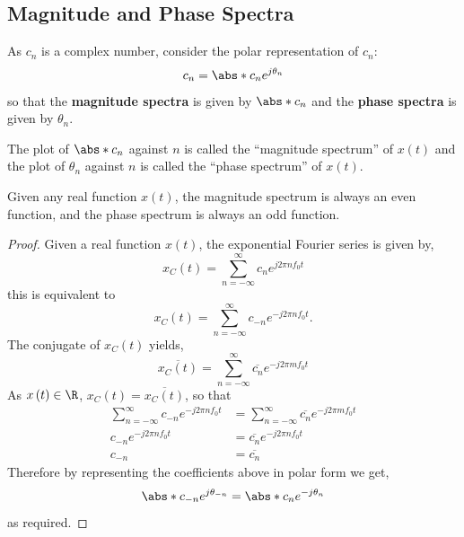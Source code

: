 \documentclass{article}
\begin{document}
\subsection{Magnitude and Phase Spectra}
As \(c_n\) is a complex number, consider the polar representation of \(c_n\):
\begin{equation*}
    c_n = \abs*{c_n} e^{j \theta_n}
\end{equation*}
so that the \textbf{magnitude spectra} is given by \(\abs*{c_n}\) and the \textbf{phase spectra} is given by \(\theta_n\).

The plot of \(\abs*{c_n}\) against \(n\) is called the ``magnitude spectrum'' of \(x\left( t \right)\) and
the plot of \(\theta_n\) against \(n\) is called the ``phase spectrum'' of \(x\left( t \right)\).
\begin{theorem}
    Given any real function \(x\left( t \right)\), the magnitude spectrum is always an even function,
    and the phase spectrum is always an odd function.
\end{theorem}
\begin{proof}
    Given a real function \(x\left( t \right)\), the exponential Fourier series is given by,
    \begin{equation*}
        x_C\left( t \right) = \sum_{n = -\infty}^\infty c_n e^{j 2\pi n f_0 t}
    \end{equation*}
    this is equivalent to
    \begin{equation*}
        x_C\left( t \right) = \sum_{n = -\infty}^\infty c_{-n} e^{-j 2\pi n f_0 t}.
    \end{equation*}
    The conjugate of \(x_C\left( t \right)\) yields,
    \begin{equation*}
        \overline{x_C\left( t \right)} = \sum_{n = -\infty}^\infty \overline{c_{n}} e^{-j 2\pi m f_0 t}
    \end{equation*}
    As \(x\left( t \right) \in \R\), \(x_C\left( t \right) = \overline{x_C\left( t \right)}\), so that
    \begin{align*}
        \sum_{n = -\infty}^\infty c_{-n} e^{-j 2\pi n f_0 t} & = \sum_{n = -\infty}^\infty \overline{c_{n}} e^{-j 2\pi m f_0 t} \\
        c_{-n} e^{-j 2\pi n f_0 t}                           & = \overline{c_n} e^{-j 2\pi n f_0 t}                             \\
        c_{-n}                                               & = \overline{c_n}
    \end{align*}
    Therefore by representing the coefficients above in polar form we get,
    \begin{equation*}
        \abs*{c_{-n}} e^{j \theta_{-n}} = \abs*{c_n} e^{-j \theta_n}
    \end{equation*}
    as required.
\end{proof}
\end{document}
